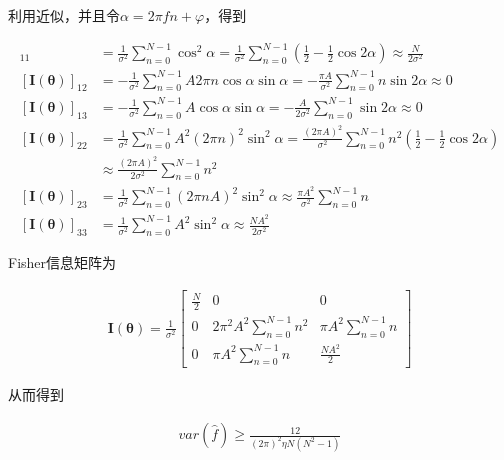 \documentclass[fontset=windows]{article}
\numberwithin{figure}{section}
\begin{document}
利用近似，并且令\(\alpha=2\pi fn+\varphi\)，得到

\begin{align*}
	[\mathbf{I}(\boldsymbol{\theta})]_{11}
	 & =\frac{1}{\sigma^2}\sum_{n=0}^{N-1}\cos^2 \alpha
	=\frac{1}{\sigma^2}\sum_{n=0}^{N-1}\left(\frac{1}{2}-\frac{1}{2}\cos2\alpha\right)
	\approx\frac{N}{2\sigma^2}                                           \\
	[\mathbf{I}(\boldsymbol{\theta})]_{12}
	 & =-\frac{1}{\sigma^2}\sum_{n=0}^{N-1}A2\pi n \cos\alpha \sin\alpha
	=-\frac{\pi A}{\sigma^2}\sum_{n=0}^{N-1}n\sin 2\alpha
	\approx 0                                                            \\
	[\mathbf{I}(\boldsymbol{\theta})]_{13}
	 & =-\frac{1}{\sigma^2}\sum_{n=0}^{N-1}A\cos\alpha \sin\alpha
	=-\frac{A}{2\sigma^2}\sum_{n=0}^{N-1}\sin 2\alpha
	\approx 0                                                            \\
	[\mathbf{I}(\boldsymbol{\theta})]_{22}
	 & =\frac{1}{\sigma^2}\sum_{n=0}^{N-1}A^2(2\pi n)^2\sin^2 \alpha
	=\frac{(2\pi A)^2}{\sigma^2}\sum_{n=0}^{N-1}n^2\left(\frac{1}{2}-
	\frac{1}{2}\cos2\alpha\right)                                        \\
	 & \approx\frac{(2\pi A)^2}{2\sigma^2}\sum_{n=0}^{N-1}n^2            \\
	[\mathbf{I}(\boldsymbol{\theta})]_{23}
	 & =\frac{1}{\sigma^2}\sum_{n=0}^{N-1}(2\pi nA)^2 \sin^2\alpha
	\approx \frac{\pi A^2}{\sigma^2}\sum_{n=0}^{N-1}n                    \\
	[\mathbf{I}(\boldsymbol{\theta})]_{33}
	 & =\frac{1}{\sigma^2}\sum_{n=0}^{N-1}A^2\sin^2 \alpha
	\approx \frac{NA^2}{2\sigma^2}
\end{align*}

Fisher信息矩阵为

\begin{align*}
	\mathbf{I}(\boldsymbol{\theta})=\frac{1}{\sigma^2}
	\begin{bmatrix}
		\frac{N}{2} & 0                             & 0                        \\
		0           & 2\pi^2 A^2\sum_{n=0}^{N-1}n^2 & \pi A^2\sum_{n=0}^{N-1}n \\
		0           & \pi A^2\sum_{n=0}^{N-1}n      & \frac{NA^2}{2}
	\end{bmatrix}
\end{align*}

从而得到

\begin{align*}
	var(\hat{f}) \geq \frac{12}{(2\pi)^2\eta N (N^2-1)}
\end{align*}
\end{document}
